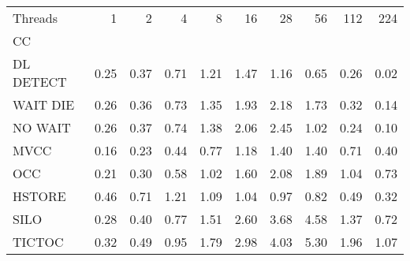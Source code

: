 \begin{tabular}{lrrrrrrrrr}
\toprule
Threads &  1   &  2   &  4   &  8   &  16  &  28  &  56  &  112 &  224 \\
CC        &      &      &      &      &      &      &      &      &      \\
\midrule
DL DETECT & 0.25 & 0.37 & 0.71 & 1.21 & 1.47 & 1.16 & 0.65 & 0.26 & 0.02 \\
WAIT DIE  & 0.26 & 0.36 & 0.73 & 1.35 & 1.93 & 2.18 & 1.73 & 0.32 & 0.14 \\
NO WAIT   & 0.26 & 0.37 & 0.74 & 1.38 & 2.06 & 2.45 & 1.02 & 0.24 & 0.10 \\
MVCC      & 0.16 & 0.23 & 0.44 & 0.77 & 1.18 & 1.40 & 1.40 & 0.71 & 0.40 \\
OCC       & 0.21 & 0.30 & 0.58 & 1.02 & 1.60 & 2.08 & 1.89 & 1.04 & 0.73 \\
HSTORE    & 0.46 & 0.71 & 1.21 & 1.09 & 1.04 & 0.97 & 0.82 & 0.49 & 0.32 \\
SILO      & 0.28 & 0.40 & 0.77 & 1.51 & 2.60 & 3.68 & 4.58 & 1.37 & 0.72 \\
TICTOC    & 0.32 & 0.49 & 0.95 & 1.79 & 2.98 & 4.03 & 5.30 & 1.96 & 1.07 \\
\bottomrule
\end{tabular}
